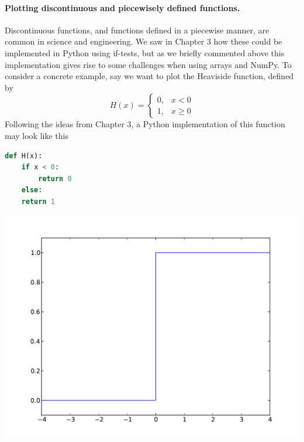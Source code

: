 \documentclass[graybox,envcountchap,sectrefs,final]{svmonodo}
\begin{document}
\paragraph{Plotting discontinuous and piecewisely defined functions.}
Discontinuous functions, and functions defined in a piecewise manner, are common in science and engineering.
We saw in Chapter 3 how these could be implemented in Python using if-tests, but as we briefly
commented above this implementation gives rise to some challenges when using arrays and NumPy. To consider
a concrete example, say we want to plot the Heaviside function, defined by
\[ H(x) = \left\lbrace\begin{array}{ll}
0, & x<0\\ 
1, & x\geq 0
\end{array}\right.
\]
Following the ideas from Chapter 3, a Python implementation of this function may look like this
\begin{lstlisting}[language=Python,style=blue1]
def H(x):
    if x < 0:
        return 0
    else:
	return 1
\end{lstlisting}



\vspace{6mm}

\centerline{\includegraphics[width=0.5\linewidth]{../chapters/fig-plot/Heaviside3.pdf}}

\vspace{6mm}
\end{document}
